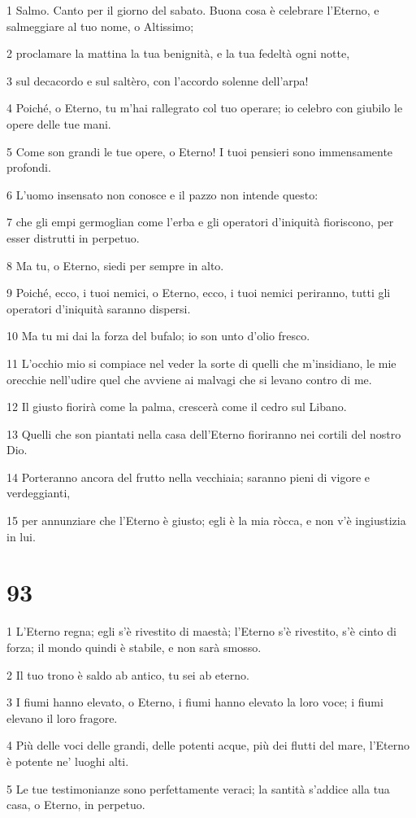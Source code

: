 \par 1 Salmo. Canto per il giorno del sabato. Buona cosa è celebrare l'Eterno, e salmeggiare al tuo nome, o Altissimo;
\par 2 proclamare la mattina la tua benignità, e la tua fedeltà ogni notte,
\par 3 sul decacordo e sul saltèro, con l'accordo solenne dell'arpa!
\par 4 Poiché, o Eterno, tu m'hai rallegrato col tuo operare; io celebro con giubilo le opere delle tue mani.
\par 5 Come son grandi le tue opere, o Eterno! I tuoi pensieri sono immensamente profondi.
\par 6 L'uomo insensato non conosce e il pazzo non intende questo:
\par 7 che gli empi germoglian come l'erba e gli operatori d'iniquità fioriscono, per esser distrutti in perpetuo.
\par 8 Ma tu, o Eterno, siedi per sempre in alto.
\par 9 Poiché, ecco, i tuoi nemici, o Eterno, ecco, i tuoi nemici periranno, tutti gli operatori d'iniquità saranno dispersi.
\par 10 Ma tu mi dai la forza del bufalo; io son unto d'olio fresco.
\par 11 L'occhio mio si compiace nel veder la sorte di quelli che m'insidiano, le mie orecchie nell'udire quel che avviene ai malvagi che si levano contro di me.
\par 12 Il giusto fiorirà come la palma, crescerà come il cedro sul Libano.
\par 13 Quelli che son piantati nella casa dell'Eterno fioriranno nei cortili del nostro Dio.
\par 14 Porteranno ancora del frutto nella vecchiaia; saranno pieni di vigore e verdeggianti,
\par 15 per annunziare che l'Eterno è giusto; egli è la mia ròcca, e non v'è ingiustizia in lui.

\chapter{93}

\par 1 L'Eterno regna; egli s'è rivestito di maestà; l'Eterno s'è rivestito, s'è cinto di forza; il mondo quindi è stabile, e non sarà smosso.
\par 2 Il tuo trono è saldo ab antico, tu sei ab eterno.
\par 3 I fiumi hanno elevato, o Eterno, i fiumi hanno elevato la loro voce; i fiumi elevano il loro fragore.
\par 4 Più delle voci delle grandi, delle potenti acque, più dei flutti del mare, l'Eterno è potente ne' luoghi alti.
\par 5 Le tue testimonianze sono perfettamente veraci; la santità s'addice alla tua casa, o Eterno, in perpetuo.

